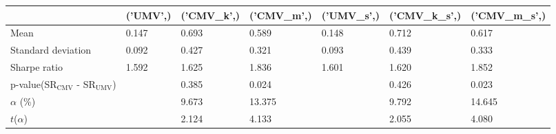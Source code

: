 \begin{tabular}{lllllll}
\toprule
 & ('UMV',) & ('CMV_k',) & ('CMV_m',) & ('UMV_s',) & ('CMV_k_s',) & ('CMV_m_s',) \\
\midrule
Mean & 0.147 & 0.693 & 0.589 & 0.148 & 0.712 & 0.617 \\
Standard deviation & 0.092 & 0.427 & 0.321 & 0.093 & 0.439 & 0.333 \\
Sharpe ratio & 1.592 & 1.625 & 1.836 & 1.601 & 1.620 & 1.852 \\
p-value(SR$_{\text{CMV}}$ - SR$_{\text{UMV}}$) &  & 0.385 & 0.024 &  & 0.426 & 0.023 \\
$\alpha$ (\%) &  & 9.673 & 13.375 &  & 9.792 & 14.645 \\
$t$($\alpha$) &  & 2.124 & 4.133 &  & 2.055 & 4.080 \\
\bottomrule
\end{tabular}
